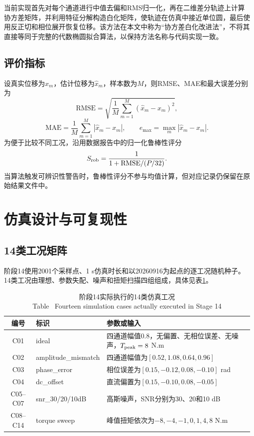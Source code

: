 \documentclass[UTF8,a4paper,12pt]{ctexart}
\newcommand{\bitablecaption}[2]{\caption{#1\\[-0.2em]\small Table \thetable\ #2}}
\begin{document}
当前实现首先对每个通道进行中值去偏和RMS归一化，再在二维差分轨迹上计算协方差矩阵，并利用特征分解构造白化矩阵，使轨迹在仿真中接近单位圆，最后使用反正切和相位展开恢复位移。该方法在本文中称为“协方差白化改进法”，不将其直接等同于完整的代数椭圆拟合算法，以保持方法名称与代码实现一致。

\subsection{评价指标}

设真实位移为$x_m$，估计位移为$\hat{x}_m$，样本数为$M$，则RMSE、MAE和最大误差分别为
\begin{equation}
  \mathrm{RMSE}=\sqrt{\frac{1}{M}\sum_{m=1}^{M}(\hat{x}_m-x_m)^2},
  \label{eq:rmse}
\end{equation}
\begin{equation}
  \mathrm{MAE}=\frac{1}{M}\sum_{m=1}^{M}|\hat{x}_m-x_m|,\qquad
  e_{\max}=\max_m|\hat{x}_m-x_m|.
  \label{eq:mae}
\end{equation}
为便于比较不同工况，沿用数据报告中的归一化鲁棒性评分
\begin{equation}
  S_{\rm rob}=\frac{1}{1+\mathrm{RMSE}/(P/32)}.
  \label{eq:robustness}
\end{equation}
当算法触发可辨识性警告时，鲁棒性评分不参与均值计算，但对应记录仍保留在原始结果文件中。

\section{仿真设计与可复现性}

\subsection{14类工况矩阵}

阶段14使用2001个采样点、1 s仿真时长和以20260916为起点的逐工况随机种子。14类工况由理想、参数失配、噪声和扭矩扫描四组组成，具体见表\ref{tab:cases}。

\begin{table}[htbp]
  \centering
  \bitablecaption{阶段14实际执行的14类仿真工况}{Fourteen simulation cases actually executed in Stage 14}
  \label{tab:cases}
  \begin{tabular}{clp{7.2cm}}
    \toprule
    编号 & 标识 & 参数或输入 \\
    \midrule
    C01 & ideal & 四通道幅值0.8，无偏置、无相位误差、无噪声，$T_{\rm peak}=8$ N.m \\
    C02 & amplitude\_mismatch & 四通道幅值为$[0.52,1.08,0.64,0.96]$ \\
    C03 & phase\_error & 相位误差为$[0.15,-0.12,0.08,-0.10]$ rad \\
    C04 & dc\_offset & 直流偏置为$[0.15,-0.10,0.08,-0.05]$ \\
    C05--C07 & snr\_30/20/10dB & 高斯噪声，SNR分别为30、20和10 dB \\
    C08--C14 & torque sweep & 峰值扭矩依次为$-8,-4,-1,0,1,4,8$ N.m \\
    \bottomrule
  \end{tabular}
\end{table}
\end{document}
